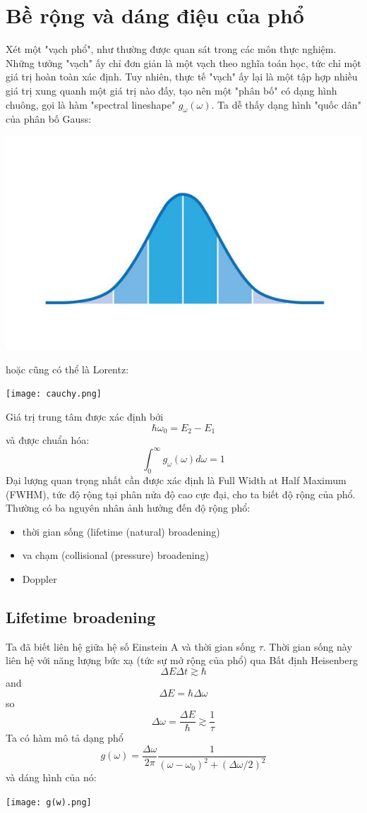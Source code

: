\documentclass{article}
\begin{document}
\section*{Bề rộng và dáng điệu của phổ}
Xét một "vạch phổ", như thường được quan sát trong các môn thực nghiệm. Những tưởng "vạch" ấy chỉ đơn giản là một vạch theo nghĩa toán học, tức chỉ một giá trị hoàn toàn xác định. Tuy nhiên, thực tế "vạch" ấy lại là một tập hợp nhiều giá trị xung quanh một giá trị nào đấy, tạo nên một "phân bố" có dạng hình chuông, gọi là hàm "spectral lineshape" $g_\omega(\omega)$.
Ta dễ thấy dạng hình "quốc dân" của phân bố Gauss:\\
\begin{center}
	\includegraphics{gauss.jpg}\\
\end{center}
hoặc cũng có thể là Lorentz:
\begin{center}
	\texttt{[image: cauchy.png]}\\
\end{center}
Giá trị trung tâm được xác định bởi $$\hbar\omega_0=E_2-E_1$$ và được chuẩn hóa: $$\int_{0}^{\infty}g_\omega(\omega)d\omega=1$$
Đại lượng quan trọng nhất cần được xác định là Full Width at Half Maximum (FWHM), tức độ rộng tại phân nửa độ cao cực đại, cho ta biết độ rộng của phổ.\\
Thường có ba nguyên nhân ảnh hưởng đến độ rộng phổ:
\begin{itemize}
	\item thời gian sống (lifetime (natural) broadening)
	\item va chạm (collisional (pressure) broadening)
	\item Doppler
\end{itemize}
\subsection*{Lifetime broadening}
Ta đã biết liên hệ giữa hệ số Einstein A và thời gian sống $\tau$. Thời gian sống này liên hệ với năng lượng bức xạ (tức sự mở rộng của phổ) qua Bất định Heisenberg $$\Delta E\Delta t\gtrsim \hbar$$
and $$\Delta E = \hbar\Delta\omega$$
so $$\Delta \omega=\frac{\Delta E}{\hbar}\gtrsim\frac{1}{\tau}$$
Ta có hàm mô tả dạng phổ $$g(\omega) = \frac{\Delta\omega}{2\pi} \frac{1}{(\omega - \omega_0)^2 + (\Delta\omega/2)^2}$$
và dáng hình của nó:
\begin{center}
	\texttt{[image: g(w).png]}\\
\end{center}
\end{document}
